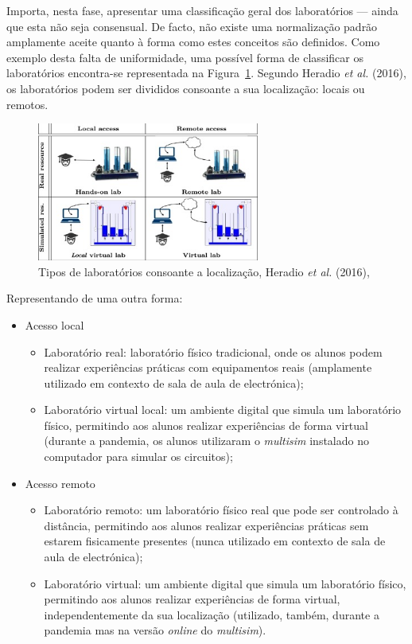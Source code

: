 Importa, nesta fase, apresentar uma classificação geral dos laboratórios — ainda que esta não seja consensual. De facto, não existe uma normalização padrão amplamente aceite quanto à forma como estes conceitos são definidos. Como exemplo desta falta de uniformidade, uma possível forma de classificar os laboratórios encontra-se representada na Figura~\ref{fig:classificaçãoHeratio}. Segundo Heradio \textit{et al.} (2016), \cite{HERADIO20161} os laboratórios podem ser divididos consoante a sua localização: locais ou remotos.

\begin{figure}[hbtp]
    \centering
    \includegraphics[width=0.65\textwidth]{figures/caracteristica_laboratories.jpg}
    \caption{Tipos de laboratórios consoante a localização, Heradio \textit{et al.} (2016), \cite{HERADIO20161}}
    \label{fig:classificaçãoHeratio}
\end{figure}

Representando de uma outra forma:
\begin{itemize}
    \item Acesso local
          \begin{itemize}
              \item Laboratório real: laboratório físico tradicional, onde os alunos podem realizar experiências práticas com equipamentos reais (amplamente utilizado em contexto de sala de aula de electrónica);
              \item Laboratório virtual local: um ambiente digital que simula um laboratório físico, permitindo aos alunos realizar experiências de forma virtual (durante a pandemia, os alunos utilizaram o \textit{multisim} instalado no computador para simular os circuitos);
          \end{itemize}
    \item Acesso remoto
          \begin{itemize}
              \item Laboratório remoto: um laboratório físico real que pode ser controlado à distância, permitindo aos alunos realizar experiências práticas sem estarem fisicamente presentes (nunca utilizado em contexto de sala de aula de electrónica);
              \item Laboratório virtual: um ambiente digital que simula um laboratório físico, permitindo aos alunos realizar experiências de forma virtual, independentemente da sua localização (utilizado, também, durante a pandemia mas na versão \textit{online} do \textit{multisim}).
          \end{itemize}
\end{itemize}

